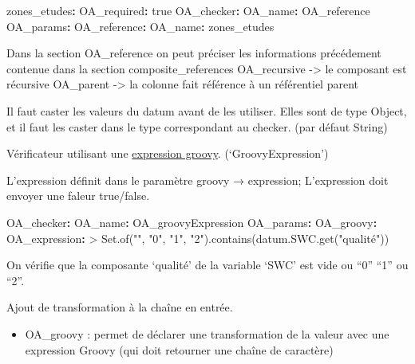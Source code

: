 \documentclass[
  letterpaper,
  DIV=11,
  numbers=noendperiod]{scrartcl}
\newenvironment{Shaded}{\begin{snugshade}}{\end{snugshade}}
\newcommand{\AttributeTok}[1]{\textcolor[rgb]{0.40,0.45,0.13}{#1}}
\newcommand{\CharTok}[1]{\textcolor[rgb]{0.13,0.47,0.30}{#1}}
\newcommand{\FunctionTok}[1]{\textcolor[rgb]{0.28,0.35,0.67}{#1}}
\newcommand{\KeywordTok}[1]{\textcolor[rgb]{0.00,0.23,0.31}{\textbf{#1}}}
\newcommand{\NormalTok}[1]{\textcolor[rgb]{0.00,0.23,0.31}{#1}}
\providecommand{\tightlist}{%
  \setlength{\itemsep}{0pt}\setlength{\parskip}{0pt}}\usepackage{longtable,booktabs,array}
\begin{document}
\begin{Shaded}
\begin{Highlighting}[]
\AttributeTok{        }\FunctionTok{zones\_etudes}\KeywordTok{:}
\AttributeTok{          }\FunctionTok{OA\_required}\KeywordTok{:}\AttributeTok{ }\CharTok{true}
\AttributeTok{          }\FunctionTok{OA\_checker}\KeywordTok{:}
\AttributeTok{              }\FunctionTok{OA\_name}\KeywordTok{:}\AttributeTok{ OA\_reference}
\AttributeTok{              }\FunctionTok{OA\_params}\KeywordTok{:}
\AttributeTok{                  }\FunctionTok{OA\_reference}\KeywordTok{:}\AttributeTok{ }
\AttributeTok{                    }\FunctionTok{OA\_name}\KeywordTok{:}\AttributeTok{ zones\_etudes}
\end{Highlighting}
\end{Shaded}

Dans la section OA\_reference on peut préciser les informations
précédement contenue dans la section composite\_references OA\_recursive
-\textgreater{} le composant est récursive OA\_parent -\textgreater{} la
colonne fait référence à un référentiel parent

Il faut caster les valeurs du datum avant de les utiliser. Elles sont de
type Object, et il faut les caster dans le type correspondant au
checker. (par défaut String)

Vérificateur utilisant une \href{validation}{expression groovy}.
(`GroovyExpression')

L'expression définit dans le paramètre groovy → expression; L'expression
doit envoyer une faleur true/false.

\begin{Shaded}
\begin{Highlighting}[]
\AttributeTok{        }\FunctionTok{OA\_checker}\KeywordTok{:}
\AttributeTok{          }\FunctionTok{OA\_name}\KeywordTok{:}\AttributeTok{ OA\_groovyExpression}
\AttributeTok{          }\FunctionTok{OA\_params}\KeywordTok{:}
\AttributeTok{            }\FunctionTok{OA\_groovy}\KeywordTok{:}
\FunctionTok{              OA\_expression}\KeywordTok{: }\CharTok{\textgreater{}}
\NormalTok{                Set.of("", "0", "1", "2").contains(datum.SWC.get("qualité"))}
\end{Highlighting}
\end{Shaded}

On vérifie que la composante `qualité' de la variable `SWC' est vide ou
``0'' ``1'' ou ``2''.

Ajout de transformation à la chaîne en entrée.

\begin{itemize}
\tightlist
\item
  OA\_groovy : permet de déclarer une transformation de la valeur avec
  une expression Groovy (qui doit retourner une chaîne de caractère)
\end{itemize}
\end{document}
